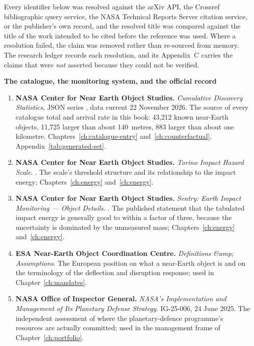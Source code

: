 Every identifier below was resolved against the arXiv API, the Crossref
bibliographic query service, the NASA Technical Reports Server citation
service, or the publisher's own record, and the resolved title was compared
against the title of the work intended to be cited before the reference was
used. Where a resolution failed, the claim was removed rather than re-sourced
from memory. The research ledger records each resolution, and its
Appendix~C carries the claims that were \emph{not} asserted because they
could not be verified.

\vspace{8pt}
{\sffamily\bfseries\small The catalogue, the monitoring system, and the
official record}

\begin{enumerate}[leftmargin=2.9em,itemsep=4pt]

\item \textbf{NASA Center for Near Earth Object Studies.} \emph{Cumulative
Discovery Statistics}, JSON series , data current
22 November 2026. The source of every catalogue total and arrival rate in
this book: 43,212 known near-Earth objects, 11,725 larger than about
140~metres, 883 larger than about one kilometre. Chapters~\ref{ch:catalogue-entry}
and~\ref{ch:counterfactual}, Appendix~\ref{tab:generated-set}.

\item \textbf{NASA Center for Near Earth Object Studies.} \emph{Torino Impact
Hazard Scale}. . The
scale's threshold structure and its relationship to the impact energy;
Chapters~\ref{ch:energy} and~\ref{ch:energy}.

\item \textbf{NASA Center for Near Earth Object Studies.} \emph{Sentry: Earth
Impact Monitoring --- Object Details}. .
The published statement that the tabulated impact energy is generally good to
within a factor of three, because the uncertainty is dominated by the
unmeasured mass; Chapters~\ref{ch:energy} and~\ref{ch:energy}.

\item \textbf{ESA Near-Earth Object Coordination Centre.} \emph{Definitions
\&amp; Assumptions}. The European position on what a near-Earth object is
and on the terminology of the deflection and disruption response; used in
Chapter~\ref{ch:mandates}.

\item \textbf{NASA Office of Inspector General.}
\emph{NASA's Implementation and Management of Its Planetary Defense
Strategy}. IG-25-006, 24 June 2025. The independent assessment of where the
planetary-defence programme's resources are actually committed; used in the
management frame of Chapter~\ref{ch:portfolio}.


\end{enumerate}
